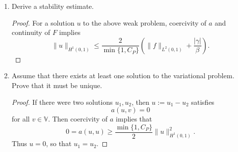 \documentclass{article}
\begin{document}
\begin{enumerate}
\begin{enumerate}
		      \item Derive a stability estimate.
		            \begin{proof}
			            For a solution $u$ to the above weak problem, coercivity of $a$ and continuity of $F$ implies \[\|u\|_{H^1(0,1)} \leq \frac{2}{\min\{1,C_P\}}\left(\|f\|_{L^2(0,1)} + \frac{|\gamma|}{\beta}\right).\]
		            \end{proof}

		      \item Assume that there exists at least one solution to the variational problem.
		            Prove that it must be unique.
		            \begin{proof}
			            If there were two solutions $u_1,u_2$, then $u := u_1-u_2$ satisfies \[a(u,v) = 0\] for all $v \in \mathbb V$.
			            Then coercivity of $a$ implies that \[0 = a(u,u) \geq \frac{\min\{1,C_P\}}{2}\|u\|_{H^1(0,1)}^2.\]
			            Thus $u = 0$, so that $u_1 = u_2$.
		            \end{proof}
	      \end{enumerate}


\end{enumerate}
\end{document}
